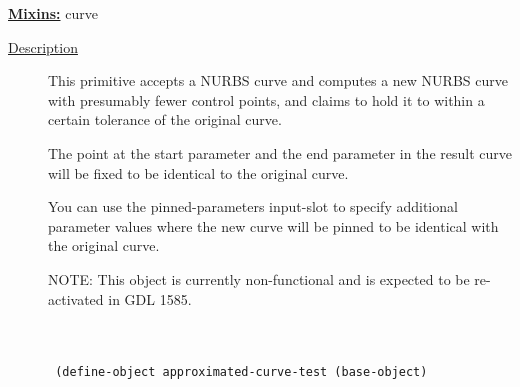 \documentclass [11pt]{book}
\begin{document}
\begin{itemize}
\textbf{
\underline{Mixins:}} curve





\begin{description}

\item [
\underline{Description}]


This primitive accepts a NURBS curve and 
computes a new NURBS curve with presumably fewer control points, and claims
to hold it to within a certain tolerance of the original curve. 

The point at the start parameter and the end parameter in the result 
curve will be fixed to be identical to the original curve. 

You can use the pinned-parameters input-slot to specify additional parameter
values where the new curve will be pinned to be identical with the original curve.

NOTE: This object is currently non-functional and is expected to be
re-activated in GDL 1585.





\end{description}




\begin{figure}
\begin{lrbox}{\boxedverb}
\begin{minipage}{\linewidth}
{\small

\begin{verbatim}


 (define-object approximated-curve-test (base-object)
  

\end{verbatim}}
\end{minipage}
\end{lrbox}
\end{figure}
\end{itemize}
\end{document}
